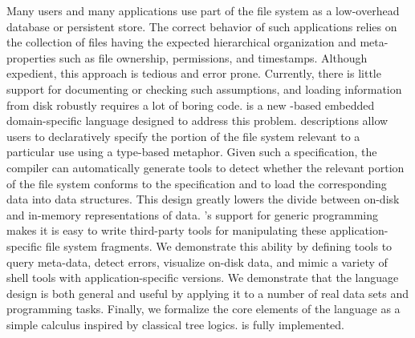 Many users and many applications use part of the file system as a
low-overhead database or persistent store.  The correct behavior of
such applications relies on the collection of files having the
expected hierarchical organization and meta-properties such as file
ownership, permissions, and timestamps.  Although expedient, this
approach is tedious and error prone.  Currently, there is little
support for documenting or checking such assumptions, and loading
information from disk robustly requires a lot of boring code.
\forest{} is a new \haskell{}-based embedded domain-specific language
designed to address this problem.  \forest{} descriptions allow users
to declaratively specify the portion of the file system relevant to a
particular use using a type-based metaphor.  Given such a
specification, the \forest{} compiler can automatically generate tools
to detect whether the relevant portion of the file system conforms to
the specification and to load the corresponding data into \haskell{}
data structures.  This design greatly lowers the divide between
on-disk and in-memory representations of data.  \haskell{}'s support
for generic programming makes it is easy to write third-party tools
for manipulating these application-specific file system fragments.  We
demonstrate this ability by defining tools to query meta-data, detect
errors, visualize on-disk data, and mimic a variety of shell tools
with application-specific versions.  We demonstrate that the language
design is both general and useful by applying it to a number of real
data sets and programming tasks.  Finally, we formalize the core
elements of the language as a simple calculus inspired by classical
tree logics. \forest{} is fully implemented. 



